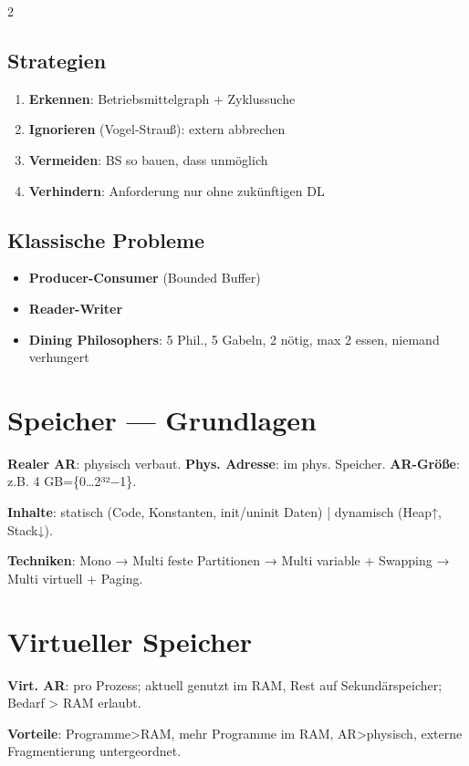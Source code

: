 \documentclass[10pt, a4paper]{article}
\begin{document}
\begin{multicols}{2}
\subsection{Strategien}
\begin{enumerate}
  \item \textbf{Erkennen}: Betriebsmittelgraph + Zyklussuche
  \item \textbf{Ignorieren} (Vogel-Strauß): extern abbrechen
  \item \textbf{Vermeiden}: BS so bauen, dass unmöglich
  \item \textbf{Verhindern}: Anforderung nur ohne zukünftigen DL
\end{enumerate}


\subsection{Klassische Probleme}
\begin{itemize}
  \item \textbf{Producer-Consumer} (Bounded Buffer)
  \item \textbf{Reader-Writer}
  \item \textbf{Dining Philosophers}: 5 Phil., 5 Gabeln, 2 nötig, max 2 essen, niemand verhungert
\end{itemize}


\section{Speicher — Grundlagen}

\textbf{Realer AR}: physisch verbaut. \textbf{Phys. Adresse}: im phys. Speicher. \textbf{AR-Größe}: z.B. 4 GB=\{0…2³²−1\}.


\textbf{Inhalte}: statisch (Code, Konstanten, init/uninit Daten) | dynamisch (Heap↑, Stack↓).


\textbf{Techniken}: Mono → Multi feste Partitionen → Multi variable + Swapping → Multi virtuell + Paging.



\section{Virtueller Speicher}

\textbf{Virt. AR}: pro Prozess; aktuell genutzt im RAM, Rest auf Sekundärspeicher; Bedarf > RAM erlaubt.


\textbf{Vorteile}: Programme>RAM, mehr Programme im RAM, AR>physisch, externe Fragmentierung untergeordnet.



\end{multicols}
\end{document}
